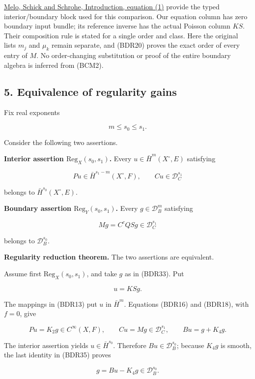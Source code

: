 \documentclass[
  11pt,
]{article}
\begin{document}
\href{https://arxiv.org/abs/math/0403059v3}{Melo, Schick and Schrohe,
Introduction, equation (1)} provide the typed interior/boundary block
used for this comparison. Our equation column has zero boundary input
bundle; its reference inverse has the actual Poisson column \(KS\).
Their composition rule is stated for a single order and class. Here the
original lists \(m_j\) and \(\mu_k\) remain separate, and (BDR20) proves
the exact order of every entry of \(M\). No order-changing substitution
or proof of the entire boundary algebra is inferred from (BCM2).

\subsection{5. Equivalence of regularity
gains}\label{equivalence-of-regularity-gains}

Fix real exponents

\[
 m\leq s_0\leq s_1.
 \tag{BDR31}
\]

Consider the following two assertions.

\textbf{Interior assertion \(\mathrm{Reg}_X(s_0,s_1)\).} Every
\(u\in\bar H^m(X^\circ,E)\) satisfying

\[
 Pu\in\bar H^{s_1-m}(X^\circ,F),
 \qquad Cu\in\mathcal D_C^{s_1}
 \tag{BDR32}
\]

belongs to \(\bar H^{s_0}(X^\circ,E)\).

\textbf{Boundary assertion \(\mathrm{Reg}_Y(s_0,s_1)\).} Every
\(g\in\mathcal D_B^m\) satisfying

\[
 Mg=C^cQSg\in\mathcal D_C^{s_1}
 \tag{BDR33}
\]

belongs to \(\mathcal D_B^{s_0}\).

\textbf{Regularity reduction theorem.} The two assertions are
equivalent.

Assume first \(\mathrm{Reg}_X(s_0,s_1)\), and take \(g\) as in (BDR33).
Put

\[
 u=KSg.
 \tag{BDR34}
\]

The mappings in (BDR13) put \(u\) in \(\bar H^m\). Equations (BDR16) and
(BDR18), with \(f=0\), give

\[
 Pu=K_2g\in C^\infty(X,F),\qquad
 Cu=Mg\in\mathcal D_C^{s_1},\qquad
 Bu=g+K_4g.
 \tag{BDR35}
\]

The interior assertion yields \(u\in\bar H^{s_0}\). Therefore
\(Bu\in\mathcal D_B^{s_0}\); because \(K_4g\) is smooth, the last
identity in (BDR35) proves

\[
 g=Bu-K_4g\in\mathcal D_B^{s_0}.
 \tag{BDR36}
\]
\end{document}
